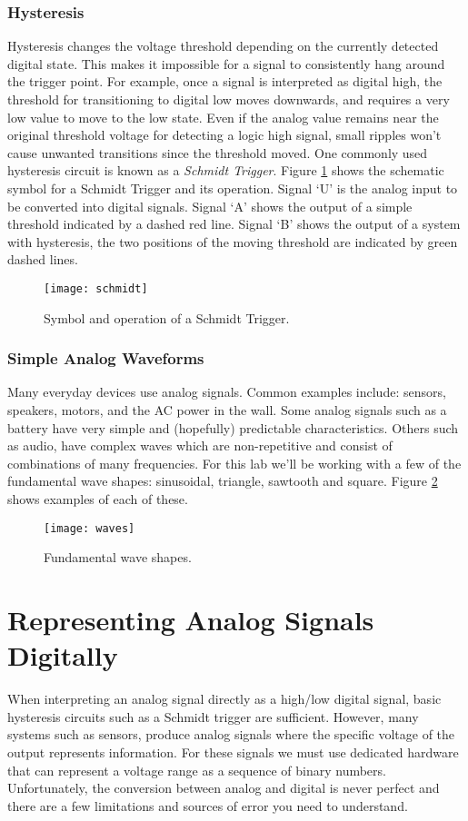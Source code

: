 \documentclass[11pt,fleqn]{book} %
\begin{document}
\subsubsection{Hysteresis}

Hysteresis changes the voltage threshold depending on the currently detected digital state. This makes it impossible for a signal to consistently hang around the trigger point. For example, once a signal is interpreted as digital high, the threshold for transitioning to digital low moves downwards, and requires a very low value to move to the low state. Even if the analog value remains near the original threshold voltage for detecting a logic high signal, small ripples won't cause unwanted transitions since the threshold moved. One commonly used hysteresis circuit is known as a \textit{Schmidt Trigger}. Figure \ref{schmidt} shows the schematic symbol for a Schmidt Trigger and its operation. Signal `U' is the analog input to be converted into digital signals. Signal `A' shows the output of a simple threshold indicated by a dashed red line. Signal `B' shows the output of a system with hysteresis, the two positions of the moving threshold are indicated by green dashed lines. 

\begin{figure}[]
    \centering\texttt{[image: schmidt]}
    \caption{Symbol and operation of a Schmidt Trigger.}
    \label{schmidt}
\end{figure}

\subsubsection{Simple Analog Waveforms}
Many everyday devices use analog signals. Common examples include: sensors, speakers, motors, and the AC power in the wall. Some analog signals such as a battery have very simple and (hopefully) predictable characteristics. Others such as audio, have complex waves which are non-repetitive and consist of combinations of many frequencies. For this lab we'll be working with a few of the fundamental wave shapes: sinusoidal, triangle, sawtooth and square. Figure \ref{waves} shows examples of each of these. 

\begin{figure}[]
    \centering\texttt{[image: waves]}
    \caption{Fundamental wave shapes.}
    \label{waves}
\end{figure}


\section{Representing Analog Signals Digitally}
When interpreting an analog signal directly as a high/low digital signal, basic hysteresis circuits such as a Schmidt trigger are sufficient. However, many systems such as sensors, produce analog signals where the specific voltage of the output represents information. For these signals we must use dedicated hardware that can represent a voltage range as a sequence of binary numbers. Unfortunately, the conversion between analog and digital is never perfect and there are a few limitations and sources of error you need to understand. 
\end{document}
